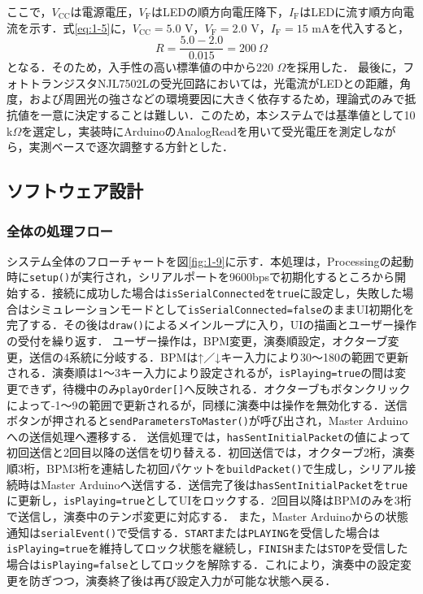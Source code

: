\documentclass[uplatex,dvipdfmx]{jlreq}
\begin{document}
ここで，$V_{\mathrm{CC}}$は電源電圧，$V_{\mathrm{F}}$はLEDの順方向電圧降下，$I_{\mathrm{F}}$はLEDに流す順方向電流を示す．式\ref{eq:1-5}に，$V_{\mathrm{CC}} = 5.0$ V，$V_{\mathrm{F}} = 2.0$ V，$I_{\mathrm{F}} = 15$ mAを代入すると，
\begin{equation}
    R = \frac{5.0 - 2.0}{0.015} = 200 \ \Omega
    \label{eq:1-6}
\end{equation}
となる．そのため，入手性の高い標準値の中から220 $\Omega$を採用した．
最後に，フォトトランジスタNJL7502Lの受光回路においては，光電流がLEDとの距離，角度，および周囲光の強さなどの環境要因に大きく依存するため，理論式のみで抵抗値を一意に決定することは難しい．このため，本システムでは基準値として10 k$\Omega$を選定し，実装時にArduinoのAnalogReadを用いて受光電圧を測定しながら，実測ベースで逐次調整する方針とした．
\fi

\subsection{ソフトウェア設計}

\subsubsection{全体の処理フロー}
システム全体のフローチャートを図\ref{fig:1-9}に示す．本処理は，Processingの起動時に\texttt{setup()}が実行され，シリアルポートを9600bpsで初期化するところから開始する．接続に成功した場合は\texttt{isSerialConnected}を\texttt{true}に設定し，失敗した場合はシミュレーションモードとして\texttt{isSerialConnected=false}のままUI初期化を完了する．その後は\texttt{draw()}によるメインループに入り，UIの描画とユーザー操作の受付を繰り返す．
ユーザー操作は，BPM変更，演奏順設定，オクターブ変更，送信の4系統に分岐する．BPMは↑／↓キー入力により30〜180の範囲で更新される．演奏順は1〜3キー入力により設定されるが，\texttt{isPlaying=true}の間は変更できず，待機中のみ\texttt{playOrder[]}へ反映される．オクターブもボタンクリックによって-1〜9の範囲で更新されるが，同様に演奏中は操作を無効化する．送信ボタンが押されると\texttt{sendParametersToMaster()}が呼び出され，Master Arduinoへの送信処理へ遷移する．
送信処理では，\texttt{hasSentInitialPacket}の値によって初回送信と2回目以降の送信を切り替える．初回送信では，オクターブ2桁，演奏順3桁，BPM3桁を連結した初回パケットを\texttt{buildPacket()}で生成し，シリアル接続時はMaster Arduinoへ送信する．送信完了後は\texttt{hasSentInitialPacket}を\texttt{true}に更新し，\texttt{isPlaying=true}としてUIをロックする．2回目以降はBPMのみを3桁で送信し，演奏中のテンポ変更に対応する．
また，Master Arduinoからの状態通知は\texttt{serialEvent()}で受信する．\texttt{START}または\texttt{PLAYING}を受信した場合は\texttt{isPlaying=true}を維持してロック状態を継続し，\texttt{FINISH}または\texttt{STOP}を受信した場合は\texttt{isPlaying=false}としてロックを解除する．これにより，演奏中の設定変更を防ぎつつ，演奏終了後は再び設定入力が可能な状態へ戻る．
\end{document}
